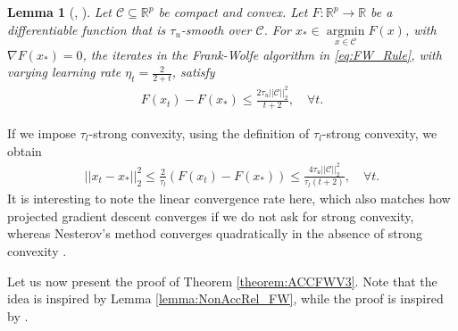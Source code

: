 \documentclass{article}
\newtheorem{lemma}{Lemma}
\begin{document}
\begin{lemma}[\cite{Recht}, \cite{FWS}]
\label{lemma:Optimiz_FW_Conv}
Let $\mathcal{C} \subseteq \mathbb{R}^p$ be compact and convex. Let $F : \mathbb{R}^p \rightarrow \mathbb{R}$ be a differentiable function that is $\tau_u$-smooth over $\mathcal{C}$. For $x_{*} \in \mathop{\arg\min}\limits_{x \in \mathcal{C}}F(x)$, with $\nabla F(x_{*}) = 0$, the iterates in the Frank-Wolfe algorithm in \eqref{eq:FW_Rule}, with varying learning rate $\eta_t = \frac{2}{2 + t}$, satisfy
\begin{align*}
F(x_t) - F(x_{*}) \leq \frac{2\tau_u ||\mathcal{C}||_2^2}{t + 2}, \quad \forall t.
\end{align*}
\end{lemma}

If we impose $\tau_l$-strong convexity, using the definition of $\tau_l$-strong convexity, we obtain
\begin{align*}
||x_t - x_{*}||_2^2 \leq \frac{2}{\tau_l} (F(x_t) - F(x_{*})) \leq \frac{4\tau_u||\mathcal{C}||_2^2}{\tau_l(t + 2)}, \quad \forall t.
\end{align*}
It is interesting to note the linear convergence rate here, which also matches how projected gradient descent converges if we do not ask for strong convexity, whereas Nesterov's method converges quadratically in the absence of strong convexity \cite{Nester}.

Let us now present the proof of Theorem \ref{theorem:ACCFWV3}. Note that the idea is inspired by Lemma \ref{lemma:NonAccRel_FW}, while the proof is inspired by \cite{ACCFW}.
\end{document}
